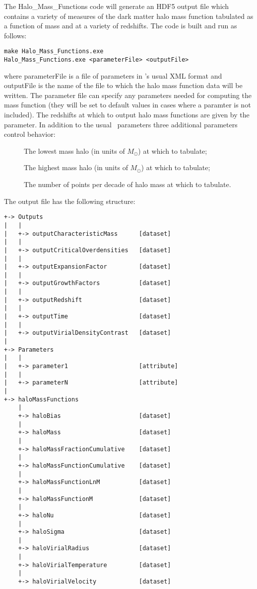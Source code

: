 The {\normalfont \ttfamily Halo\_Mass\_Functions} code will generate an HDF5 output file which contains a variety of measures of the dark matter halo mass function tabulated as a function of mass and at a variety of redshifts. The code is built and run as follows:
\begin{verbatim}
make Halo_Mass_Functions.exe
Halo_Mass_Functions.exe <parameterFile> <outputFile>
\end{verbatim}
where {\normalfont \ttfamily parameterFile} is a file of parameters in \glc's usual XML format and {\normalfont \ttfamily outputFile} is the name of the file to which the halo mass function data will be written. The parameter file can specify any parameters needed for computing the mass function (they will be set to default values in cases where a paramter is not included). The redshifts at which to output halo mass functions are given by the {\normalfont \ttfamily [outputRedshifts]} parameter. In addition to the usual \glc\ parameters three additional parameters control behavior:
\begin{description}
\item [{\normalfont \ttfamily [haloMassFunctionsMassMinimum]}] The lowest mass halo (in units of $M_\odot$) at which to tabulate;
\item [{\normalfont \ttfamily [haloMassFunctionsMassMaximum]}] The highest mass halo (in units of $M_\odot$) at which to tabulate;
\item [{\normalfont \ttfamily [haloMassFunctionsPointsPerDecade]}] The number of points per decade of halo mass at which to tabulate.
\end{description}
The output file has the following structure:
\begin{verbatim}
+-> Outputs
|   |
|   +-> outputCharacteristicMass      [dataset]
|   |
|   +-> outputCriticalOverdensities   [dataset]
|   |
|   +-> outputExpansionFactor         [dataset]
|   |
|   +-> outputGrowthFactors           [dataset]
|   |
|   +-> outputRedshift                [dataset]
|   |
|   +-> outputTime                    [dataset]
|   |
|   +-> outputVirialDensityContrast   [dataset]
|    
+-> Parameters
|   |
|   +-> parameter1                    [attribute]
|   |
|   +-> parameterN                    [attribute]
|    
+-> haloMassFunctions
    |
    +-> haloBias                      [dataset]
    |
    +-> haloMass                      [dataset]
    |
    +-> haloMassFractionCumulative    [dataset]
    |
    +-> haloMassFunctionCumulative    [dataset]
    |
    +-> haloMassFunctionLnM           [dataset]
    |
    +-> haloMassFunctionM             [dataset]
    |
    +-> haloNu                        [dataset]
    |
    +-> haloSigma                     [dataset]
    |
    +-> haloVirialRadius              [dataset]
    |
    +-> haloVirialTemperature         [dataset]
    |
    +-> haloVirialVelocity            [dataset]
\end{verbatim}
